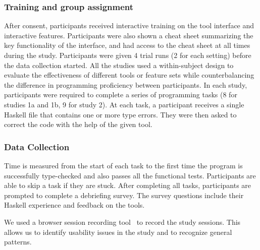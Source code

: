\subsubsection*{\textbf{Training and group assignment}}
After consent, participants received interactive training on the tool interface and interactive features. Participants were also shown a cheat sheet summarizing the key functionality of the interface, and had access to the cheat sheet at all times during the study. Participants were given 4 trial runs (2 for each setting) before the data collection started. 
All the studies used a within-subject design to evaluate the effectiveness of different tools or feature sets while counterbalancing the difference in programming proficiency between participants. In each study, participants were required to complete a series of programming tasks (8 for studies 1a and 1b, 9 for study 2). At each task, a participant receives a single Haskell file that contains one or more type errors. They were then asked to correct the code with the help of the given tool.


\subsubsection*{\textbf{Data Collection}}
Time is measured from the start of each task to the first time the program is successfully type-checked and also passes all the functional tests. Participants are able to skip a task if they are stuck. 
After completing all tasks, participants are prompted to complete a debriefing survey. The survey questions include their Haskell experience and feedback on the tools.

We used a browser session recording tool~\cite{OpenReplay2022-nw} to record the study sessions. This allows us to identify usability issues in the study and to recognize general patterns. 

